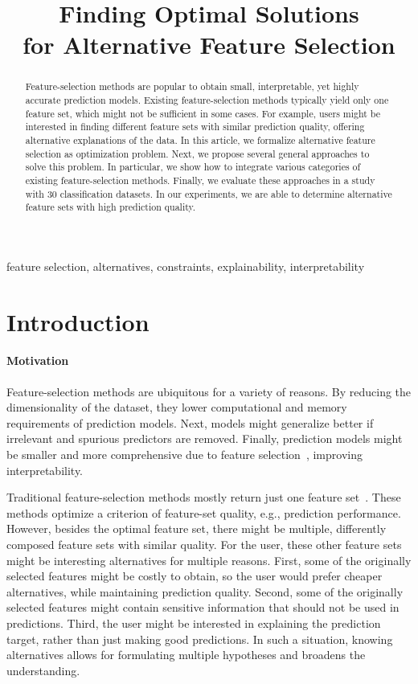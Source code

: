 \documentclass[conference]{IEEEtran}
\title{Finding Optimal Solutions \\ for Alternative Feature Selection}
\author{
	\IEEEauthorblockN{Jakob Bach}
	\IEEEauthorblockA{
		\textit{Department of Informatics} \\
		\textit{Karlsruhe Institute of Technologie (KIT)}\\
		Karlsruhe, Germany \\
		jakob.bach@kit.edu
	}
}
\theoremstyle{definition}
\begin{document}
\maketitle

\begin{abstract}
Feature-selection methods are popular to obtain small, interpretable, yet highly accurate prediction models.
Existing feature-selection methods typically yield only one feature set, which might not be sufficient in some cases.
For example, users might be interested in finding different feature sets with similar prediction quality, offering alternative explanations of the data.
In this article, we formalize alternative feature selection as optimization problem.
Next, we propose several general approaches to solve this problem.
In particular, we show how to integrate various categories of existing feature-selection methods.
Finally, we evaluate these approaches in a study with 30 classification datasets.
In our experiments, we are able to determine alternative feature sets with high prediction quality.
\end{abstract}

\begin{IEEEkeywords}
feature selection, alternatives, constraints, explainability, interpretability
\end{IEEEkeywords}

\section{Introduction}
\label{sec:introduction}

\paragraph{Motivation}

Feature-selection methods are ubiquitous for a variety of reasons.
By reducing the dimensionality of the dataset, they lower computational and memory requirements of prediction models.
Next, models might generalize better if irrelevant and spurious predictors are removed.
Finally, prediction models might be smaller and more comprehensive due to feature selection~\cite{li2017feature}, improving interpretability.

Traditional feature-selection methods mostly return just one feature set~\cite{borboudakis2021extending}.
These methods optimize a criterion of feature-set quality, e.g., prediction performance.
However, besides the optimal feature set, there might be multiple, differently composed feature sets with similar quality.
For the user, these other feature sets might be interesting alternatives for multiple reasons.
First, some of the originally selected features might be costly to obtain, so the user would prefer cheaper alternatives, while maintaining prediction quality.
Second, some of the originally selected features might contain sensitive information that should not be used in predictions.
Third, the user might be interested in explaining the prediction target, rather than just making good predictions.
In such a situation, knowing alternatives allows for formulating multiple hypotheses and broadens the understanding.
\end{document}
